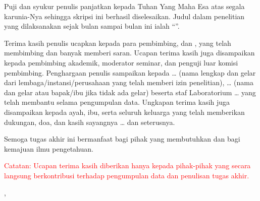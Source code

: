 %


Puji dan syukur penulis panjatkan kepada Tuhan Yang Maha Esa atas segala
karunia-Nya sehingga skripsi ini berhasil diselesaikan. Judul dalam penelitian
yang dilaksanakan sejak bulan \BulanMulaiPenelitian{} \TahunMulaiPenelitian{}
sampai bulan \BulanSelesaiPenelitian{} \TahunSelesaiPenelitian{} ini ialah
``\JudulSkripsi''.

Terima kasih penulis ucapkan kepada para pembimbing,
\NamaPembimbingSatu{} dan \NamaPembimbingDua, yang telah membimbing
dan banyak memberi saran. Ucapan terima kasih juga disampaikan kepada
pembimbing akademik, moderator seminar, dan penguji luar komisi pembimbing.
Penghargaan penulis sampaikan kepada \ldots{} (nama lengkap dan gelar dari
lembaga/instansi/perusahaan yang telah memberi izin penelitian), \ldots{}
(nama dan gelar atau bapak/ibu jika tidak ada gelar) beserta staf Laboratorium
\ldots{} yang telah membantu selama pengumpulan data. Ungkapan terima kasih
juga disampaikan kepada ayah, ibu, serta seluruh keluarga yang telah
memberikan dukungan, doa, dan kasih sayangnya \ldots{} dan seterusnya.


Semoga tugas akhir ini bermanfaat bagi pihak yang membutuhkan dan bagi
kemajuan ilmu pengetahuan.

\vspace{14pt}

\noindent\textcolor{red}{Catatan: Ucapan terima kasih diberikan hanya kepada
pihak-pihak yang secara langsung berkontribusi terhadap pengumpulan data dan
penulisan tugas akhir.}

\vspace{2\baselineskip}

\begin{flushright}
\KotaUniversitas, \BulanTahunDokumen\\[\baselineskip]
\NamaPenulis
\end{flushright}
